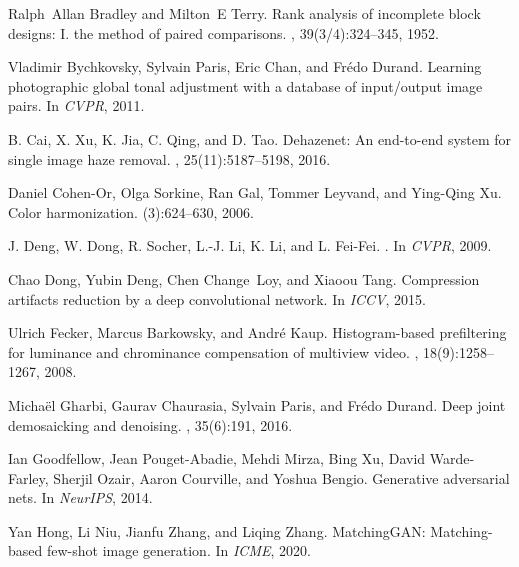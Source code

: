 \documentclass[10pt,twocolumn,letterpaper]{article}
\begin{document}
\small
\balance
\begin{thebibliography}{10}\itemsep=-1pt

Ralph~Allan Bradley and Milton~E Terry.
\newblock Rank analysis of incomplete block designs: I. the method of paired
  comparisons.
, 39(3/4):324--345, 1952.

Vladimir Bychkovsky, Sylvain Paris, Eric Chan, and Fr{\'e}do Durand.
\newblock Learning photographic global tonal adjustment with a database of
  input/output image pairs.
\newblock In {\em CVPR}, 2011.

B. {Cai}, X. {Xu}, K. {Jia}, C. {Qing}, and D. {Tao}.
\newblock Dehazenet: An end-to-end system for single image haze removal.
, 25(11):5187--5198, 2016.

Daniel Cohen-Or, Olga Sorkine, Ran Gal, Tommer Leyvand, and Ying-Qing Xu.
\newblock Color harmonization.
(3):624--630, 2006.

J. Deng, W. Dong, R. Socher, L.-J. Li, K. Li, and L. Fei-Fei.
.
\newblock In {\em CVPR}, 2009.

Chao Dong, Yubin Deng, Chen Change~Loy, and Xiaoou Tang.
\newblock Compression artifacts reduction by a deep convolutional network.
\newblock In {\em ICCV}, 2015.

Ulrich Fecker, Marcus Barkowsky, and Andr{\'e} Kaup.
\newblock Histogram-based prefiltering for luminance and chrominance
  compensation of multiview video.
,
  18(9):1258--1267, 2008.

Micha{\"e}l Gharbi, Gaurav Chaurasia, Sylvain Paris, and Fr{\'e}do Durand.
\newblock Deep joint demosaicking and denoising.
, 35(6):191, 2016.

Ian Goodfellow, Jean Pouget-Abadie, Mehdi Mirza, Bing Xu, David Warde-Farley,
  Sherjil Ozair, Aaron Courville, and Yoshua Bengio.
\newblock Generative adversarial nets.
\newblock In {\em NeurIPS}, 2014.

Yan Hong, Li Niu, Jianfu Zhang, and Liqing Zhang.
\newblock Matching{GAN}: Matching-based few-shot image generation.
\newblock In {\em ICME}, 2020.


\end{thebibliography}
\end{document}
